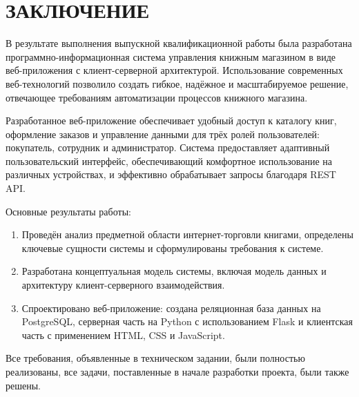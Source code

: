 \section*{ЗАКЛЮЧЕНИЕ}

В результате выполнения выпускной квалификационной работы была разработана программно-информационная система управления книжным магазином в виде веб-приложения с клиент-серверной архитектурой. Использование современных веб-технологий позволило создать гибкое, надёжное и масштабируемое решение, отвечающее требованиям автоматизации процессов книжного магазина.

Разработанное веб-приложение обеспечивает удобный доступ к каталогу книг, оформление заказов и управление данными для трёх ролей пользователей: покупатель, сотрудник и администратор. Система предоставляет адаптивный пользовательский интерфейс, обеспечивающий комфортное использование на различных устройствах, и эффективно обрабатывает запросы благодаря REST API.

Основные результаты работы:

\begin{enumerate}
\item Проведён анализ предметной области интернет-торговли книгами, определены ключевые сущности системы и сформулированы требования к системе.
\item Разработана концептуальная модель системы, включая модель данных и архитектуру клиент-серверного взаимодействия.
\item Спроектировано веб-приложение: создана реляционная база данных на PostgreSQL, серверная часть на Python с использованием Flask и клиентская часть с применением HTML, CSS и JavaScript.
\end{enumerate}

Все требования, объявленные в техническом задании, были полностью реализованы, все задачи, поставленные в начале разработки проекта, были также решены.
